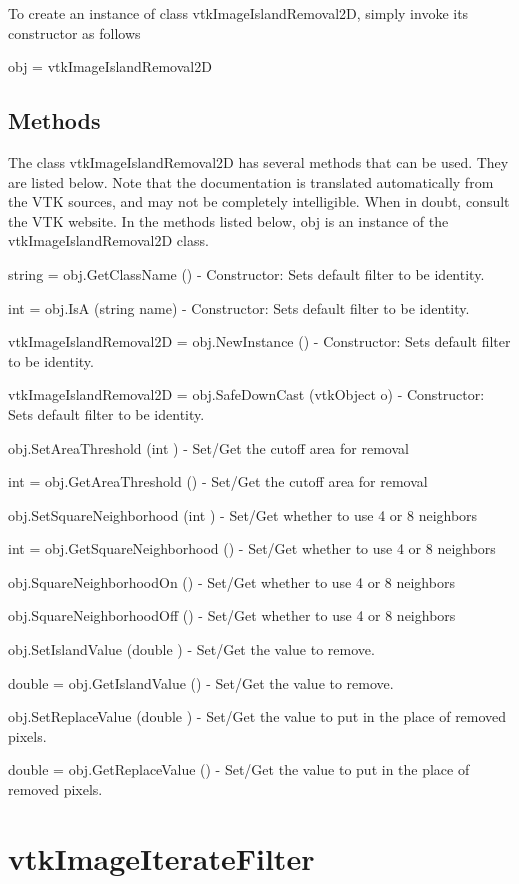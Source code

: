 To create an instance of class vtk\-Image\-Island\-Removal2\-D, simply invoke its constructor as follows \begin{DoxyVerb}  obj = vtkImageIslandRemoval2D
\end{DoxyVerb}
 \hypertarget{vtkwidgets_vtkxyplotwidget_Methods}{}\subsection{Methods}\label{vtkwidgets_vtkxyplotwidget_Methods}
The class vtk\-Image\-Island\-Removal2\-D has several methods that can be used. They are listed below. Note that the documentation is translated automatically from the V\-T\-K sources, and may not be completely intelligible. When in doubt, consult the V\-T\-K website. In the methods listed below, {\ttfamily obj} is an instance of the vtk\-Image\-Island\-Removal2\-D class. 
\begin{DoxyItemize}
\item {\ttfamily string = obj.\-Get\-Class\-Name ()} -\/ Constructor\-: Sets default filter to be identity.  
\item {\ttfamily int = obj.\-Is\-A (string name)} -\/ Constructor\-: Sets default filter to be identity.  
\item {\ttfamily vtk\-Image\-Island\-Removal2\-D = obj.\-New\-Instance ()} -\/ Constructor\-: Sets default filter to be identity.  
\item {\ttfamily vtk\-Image\-Island\-Removal2\-D = obj.\-Safe\-Down\-Cast (vtk\-Object o)} -\/ Constructor\-: Sets default filter to be identity.  
\item {\ttfamily obj.\-Set\-Area\-Threshold (int )} -\/ Set/\-Get the cutoff area for removal  
\item {\ttfamily int = obj.\-Get\-Area\-Threshold ()} -\/ Set/\-Get the cutoff area for removal  
\item {\ttfamily obj.\-Set\-Square\-Neighborhood (int )} -\/ Set/\-Get whether to use 4 or 8 neighbors  
\item {\ttfamily int = obj.\-Get\-Square\-Neighborhood ()} -\/ Set/\-Get whether to use 4 or 8 neighbors  
\item {\ttfamily obj.\-Square\-Neighborhood\-On ()} -\/ Set/\-Get whether to use 4 or 8 neighbors  
\item {\ttfamily obj.\-Square\-Neighborhood\-Off ()} -\/ Set/\-Get whether to use 4 or 8 neighbors  
\item {\ttfamily obj.\-Set\-Island\-Value (double )} -\/ Set/\-Get the value to remove.  
\item {\ttfamily double = obj.\-Get\-Island\-Value ()} -\/ Set/\-Get the value to remove.  
\item {\ttfamily obj.\-Set\-Replace\-Value (double )} -\/ Set/\-Get the value to put in the place of removed pixels.  
\item {\ttfamily double = obj.\-Get\-Replace\-Value ()} -\/ Set/\-Get the value to put in the place of removed pixels.  
\end{DoxyItemize}\hypertarget{vtkimaging_vtkimageiteratefilter}{}\section{vtk\-Image\-Iterate\-Filter}\label{vtkimaging_vtkimageiteratefilter}

